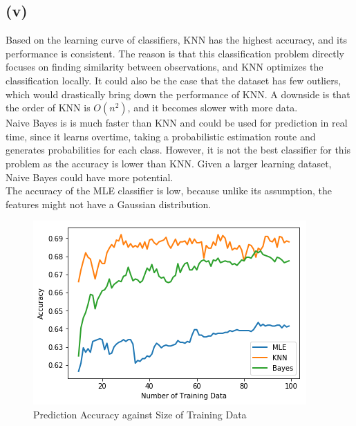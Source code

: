 \documentclass[twoside,11pt]{homework}
\begin{document}
	
\subsection*{(v)}  
	Based on the learning curve of classifiers, KNN has the highest accuracy, and its performance is consistent.
	The reason is that this classification problem directly focuses on finding similarity between observations, 
	and KNN optimizes the classification locally. It could also be the case that the dataset has few outliers, 
	which would drastically bring down the performance of KNN. A downside is that the order of KNN is 
	$O(n^2)$, and it becomes slower with more data. \\
	
	Naive Bayes is is much faster than KNN and could be used for prediction in real time, 
	since it learns overtime, taking a probabilistic estimation route and generates probabilities for each class. 
	However, it is not the best classifier for this problem as the accuracy is lower than KNN. 
	Given a larger learning dataset, Naive Bayes could have more potential. \\
	
	The accuracy of the MLE classifier is low, because unlike its assumption, the features might not have a Gaussian distribution.
	
	\begin{figure}[H]
		\centering
		\includegraphics[scale=.5]{q5_fig/classifiers.png}	
		\caption{Prediction Accuracy against Size of Training Data}
	\end{figure}
\end{document}
